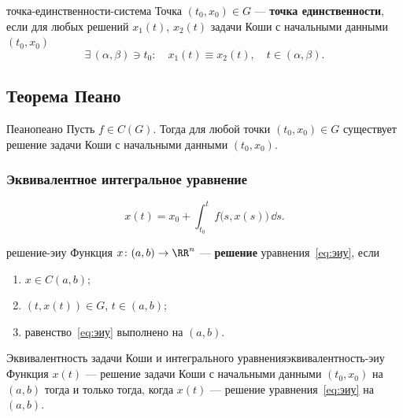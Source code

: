 \begin{Definition}{}{точка-единственности-система}
	Точка $(t_0,x_0) \in G$ --- \textbf{точка единственности}, если для любых
	решений $x_1(t)$, $x_2(t)$ задачи Коши с начальными данными $(t_0,x_0)$
	\[
	\exists\,(\alpha,\beta) \ni t_0 \colon \quad
	x_1(t) \equiv x_2(t), \quad t \in (\alpha,\beta).
	\]
\end{Definition}

\subsection{Теорема Пеано}\label{sec:пеано}

\begin{Theorem}{Пеано}{пеано}
	Пусть $f \in C(G)$. Тогда для любой точки $(t_0,x_0) \in G$ существует
	решение задачи Коши с начальными данными $(t_0,x_0)$.
\end{Theorem}

\subsubsection*{Эквивалентное интегральное уравнение}

\begin{equation}\label{eq:эиу}
	x(t) = x_0 + \int_{t_0}^{t} f\bigl(s, x(s)\bigr)\,\dd s.
\end{equation}

\begin{Definition}{}{решение-эиу}
	Функция $x \colon (a,b) \to \RR^n$ --- \textbf{решение}
	уравнения~\eqref{eq:эиу}, если
	\begin{enumerate}
		\item $x \in C(a,b)$;
		\item $(t, x(t)) \in G$, $t \in (a,b)$;
		\item равенство~\eqref{eq:эиу} выполнено на $(a,b)$.
	\end{enumerate}
\end{Definition}

\begin{Lemma}{Эквивалентность задачи Коши и интегрального уравнения}{эквивалентность-эиу}
	Функция $x(t)$ --- решение задачи Коши с начальными данными $(t_0,x_0)$
	на $(a,b)$ тогда и только тогда, когда $x(t)$ --- решение
	уравнения~\eqref{eq:эиу} на $(a,b)$.
\end{Lemma}

